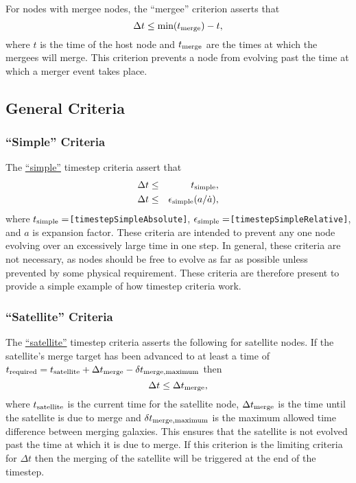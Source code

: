 For \glspl{node} with \gls{mergee} \glspl{node}, the ``\gls{mergee}'' criterion asserts that
\begin{equation}
 \Delta t \le \hbox{min}(t_{\rm merge}) - t,
\end{equation}
where $t$ is the time of the host \gls{node} and $t_{\rm merge}$ are the times at which the \glspl{mergee} will merge. This criterion prevents a \gls{node} from evolving past the time at which a merger event takes place.

\subsection{General Criteria}

\subsubsection{``Simple'' Criteria}

The \hyperlink{merger_trees.evolve.timesteps.simple.F90:merger_tree_timesteps_simple:merger_tree_timestep_simple}{``simple''} timestep criteria assert that
\begin{eqnarray}
\Delta t &\le& t_{\rm simple}, \\
\Delta t &\le& \epsilon_{\rm simple} (a/\dot{a}),
\end{eqnarray}
where $t_{\rm simple}=${\tt [timestepSimpleAbsolute]}, $\epsilon_{\rm simple}=${\tt [timestepSimpleRelative]}, and $a$ is expansion factor. These criteria are intended to prevent any one node evolving over an excessively large time in one step. In general, these criteria are not necessary, as nodes should be free to evolve as far as possible unless prevented by some physical requirement. These criteria are therefore present to provide a simple example of how timestep criteria work.

\subsubsection{``Satellite'' Criteria}

The \hyperlink{merger_trees.evolve.timesteps.satellite.F90:merger_tree_timesteps_satellite:merger_tree_timestep_satellite}{``satellite''} timestep criteria asserts the following for satellite \glspl{node}. If the satellite's merge target has been advanced to at least a time of $t_{\rm required} = t_{\rm satellite} + \Delta t_{\rm merge} - \delta t_{\rm merge,maximum}$ then 
\begin{equation}
\Delta t \le \Delta t_{\rm merge},
\end{equation}
where $t_{\rm satellite}$ is the current time for the satellite \gls{node}, $\Delta t_{\rm merge}$ is the time until the satellite is due to merge and $\delta t_{\rm merge,maximum}$ is the maximum allowed time difference between merging galaxies. This ensures that the satellite is not evolved past the time at which it is due to merge. If this criterion is the limiting criteria for $\Delta t$ then the merging of the satellite will be triggered at the end of the timestep.

